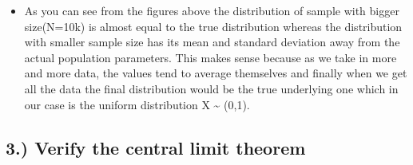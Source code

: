 \documentclass[11pt]{article}
\providecommand{\tightlist}{%
      \setlength{\itemsep}{0pt}\setlength{\parskip}{0pt}}
\begin{document}
    \begin{itemize}
\tightlist
\item
  As you can see from the figures above the distribution of sample with
  bigger size(N=10k) is almost equal to the true distribution whereas
  the distribution with smaller sample size has its mean and standard
  deviation away from the actual population parameters. This makes sense
  because as we take in more and more data, the values tend to average
  themselves and finally when we get all the data the final distribution
  would be the true underlying one which in our case is the uniform
  distribution X \textasciitilde{} (0,1).
\end{itemize}

    \subsection{3.) Verify the central limit
theorem}\label{verify-the-central-limit-theorem}
\end{document}
